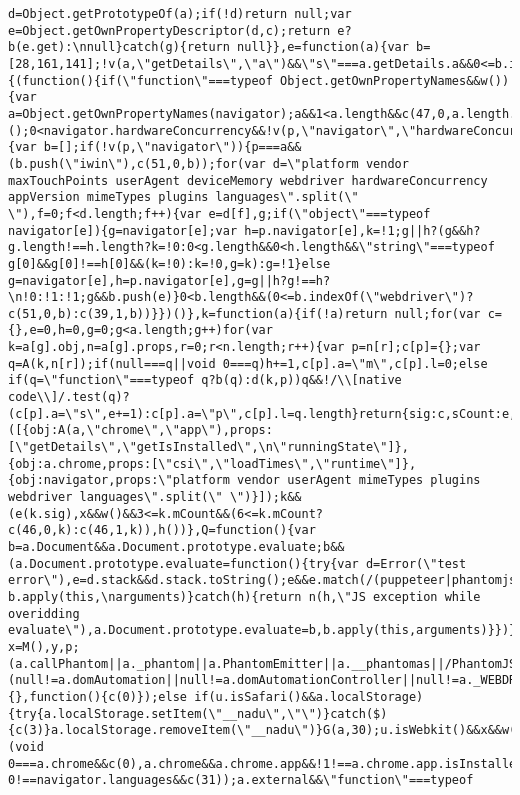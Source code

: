 \documentclass[
]{article}
\begin{document}
\begin{verbatim}
d=Object.getPrototypeOf(a);if(!d)return null;var e=Object.getOwnPropertyDescriptor(d,c);return e?b(e.get):\nnull}catch(g){return null}},e=function(a){var b=[28,161,141];!v(a,\"getDetails\",\"a\")&&\"s\"===a.getDetails.a&&0<=b.indexOf(a.getDetails.l)&&c(45,0,k)},h=function(){(function(){if(\"function\"===typeof Object.getOwnPropertyNames&&w()){var a=Object.getOwnPropertyNames(navigator);a&&1<a.length&&c(47,0,a.length.toString())}})();0<navigator.hardwareConcurrency&&!v(p,\"navigator\",\"hardwareConcurrency\")&&p.navigator.hardwareConcurrency!==navigator.hardwareConcurrency&&c(48,0,p.navigator.hardwareConcurrency.toString());\n(function(){var b=[];if(!v(p,\"navigator\")){p===a&&(b.push(\"iwin\"),c(51,0,b));for(var d=\"platform vendor maxTouchPoints userAgent deviceMemory webdriver hardwareConcurrency appVersion mimeTypes plugins languages\".split(\" \"),f=0;f<d.length;f++){var e=d[f],g;if(\"object\"===typeof navigator[e]){g=navigator[e];var h=p.navigator[e],k=!1;g||h?(g&&h?g.length!==h.length?k=!0:0<g.length&&0<h.length&&\"string\"===typeof g[0]&&g[0]!==h[0]&&(k=!0):k=!0,g=k):g=!1}else g=navigator[e],h=p.navigator[e],g=g||h?g!==h?\n!0:!1:!1;g&&b.push(e)}0<b.length&&(0<=b.indexOf(\"webdriver\")?c(51,0,b):c(39,1,b))}})()},k=function(a){if(!a)return null;for(var c={},e=0,h=0,g=0;g<a.length;g++)for(var k=a[g].obj,n=a[g].props,r=0;r<n.length;r++){var p=n[r];c[p]={};var q=A(k,n[r]);if(null===q||void 0===q)h+=1,c[p].a=\"m\",c[p].l=0;else if(q=\"function\"===typeof q?b(q):d(k,p))q&&!/\\[native code\\]/.test(q)?(c[p].a=\"s\",e+=1):c[p].a=\"p\",c[p].l=q.length}return{sig:c,sCount:e,mCount:h}}([{obj:A(a,\"chrome\",\"app\"),props:[\"getDetails\",\"getIsInstalled\",\n\"runningState\"]},{obj:a.chrome,props:[\"csi\",\"loadTimes\",\"runtime\"]},{obj:navigator,props:\"platform vendor userAgent mimeTypes plugins webdriver languages\".split(\" \")}]);k&&(e(k.sig),x&&w()&&3<=k.mCount&&(6<=k.mCount?c(46,0,k):c(46,1,k)),h())},Q=function(){var b=a.Document&&a.Document.prototype.evaluate;b&&(a.Document.prototype.evaluate=function(){try{var d=Error(\"test error\"),e=d.stack&&d.stack.toString();e&&e.match(/(puppeteer|phantomjs|apply.xpath)/)&&c(52,0,e);a.Document.prototype.evaluate=b;return b.apply(this,\narguments)}catch(h){return n(h,\"JS exception while overidding evaluate\"),a.Document.prototype.evaluate=b,b.apply(this,arguments)}})};try{v(navigator,\"userAgent\")&&c(20);var x=M(),y,p;(a.callPhantom||a._phantom||a.PhantomEmitter||a.__phantomas||/PhantomJS/.test(navigator.userAgent))&&c(5);a.Buffer&&c(12);a.emit&&c(13);a.spawn&&c(14);(null!=a.domAutomation||null!=a.domAutomationController||null!=a._WEBDRIVER_ELEM_CACHE||/HeadlessChrome/.test(navigator.userAgent)||\"\"===navigator.languages)&&c(0);if(u.isChrome()&&\na.webkitRequestFileSystem)a.webkitRequestFileSystem(a.TEMPORARY,1,function(){},function(){c(0)});else if(u.isSafari()&&a.localStorage){try{a.localStorage.setItem(\"__nadu\",\"\")}catch($){c(3)}a.localStorage.removeItem(\"__nadu\")}G(a,30);u.isWebkit()&&x&&w()&&(void 0===a.chrome&&c(0),a.chrome&&a.chrome.app&&!1!==a.chrome.app.isInstalled&&void 0!==navigator.languages&&c(31));a.external&&\"function\"===typeof 
\end{verbatim}
\end{document}
